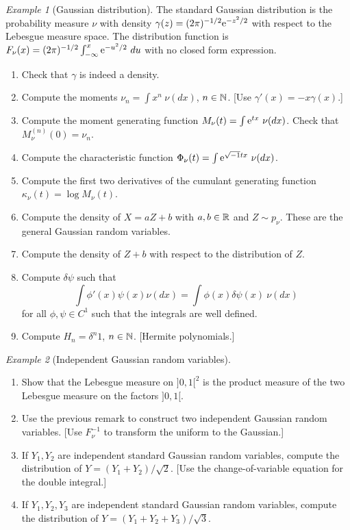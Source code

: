 \documentclass[12pt,a4paper]{amsart}
\theoremstyle{plain}%
\theoremstyle{definition}
\theoremstyle{remark}
\newtheorem{example}{Example}
\begin{document}
\begin{example}[Gaussian distribution]
The standard Gaussian distribution is the probability measure $\nu$
with density $\gamma(z) = (2\pi)^{-1/2} \mathrm{e}^{-z^2/2}$ with respect
to the Lebesgue measure space. The distribution function is $F_\nu(x) = (2\pi)^{-1/2} \int_{-\infty}^x \mathrm{e}^{-u^2/2} \ du$ with no closed form expression.
\begin{enumerate}
\item Check that $\gamma$ is indeed a density.
\item Compute the moments $\nu_n = \int x^n \ \nu(dx)$, $n \in \mathbb{N}$. [Use $\gamma'(x) = -x \gamma(x)$.]
\item Compute the moment generating function $M_\nu(t) = \int \mathrm{e} ^{tx} \ \nu(dx)$. Check that $M^{(n)}_\nu(0) = \nu_n$.
\item Compute the characteristic function $\Phi_\nu(t) = \int \euler ^{\sqrt{-1} tx} \ \nu(dx)$.
\item Compute the first two derivatives of the cumulant generating function $\kappa_\nu(t) = \log M_\nu(t)$.
\item Compute the density of $X = aZ + b$ with $a,b \in \mathbb{R}$ and $Z \sim p_\nu$. These are the general Gaussian random variables. 
\item Compute the density of $Z + b$ with respect to the distribution of $Z$.
\item Compute $\delta \psi$ such that
  \begin{equation*}
    \int \phi'(x) \psi(x)  \nu(dx) = \int \phi(x) \delta \psi(x) \ \nu(dx)
  \end{equation*}
for all $\phi,\psi \in C^1$ such that the integrals are well defined.
\item Compute $H_n = \delta^n 1$, $n \in \mathbb{N}$. [Hermite polynomials.]
\end{enumerate}  
\end{example}

\begin{example}[Independent Gaussian random variables]
  \begin{enumerate}
  \item Show that the Lebesgue measure on $]0,1[^2$ is the product
    measure of the two Lebesgue measure on the factors $]0,1[$.
  \item Use the previous remark to construct two independent Gaussian random variables. [Use $F_\nu^{-1}$ to transform the uniform to the Gaussian.]
  \item If $Y_1,Y_2$ are independent standard Gaussian random variables, compute the distribution of $Y = (Y_1 + Y_2)/\sqrt 2$. [Use the change-of-variable equation for the double integral.]
  \item If $Y_1,Y_2,Y_3$ are independent standard Gaussian random
    variables, compute the distribution of $Y = (Y_1+Y_2+Y_3)/\sqrt 3$.
  \end{enumerate}
\end{example}
\end{document}
